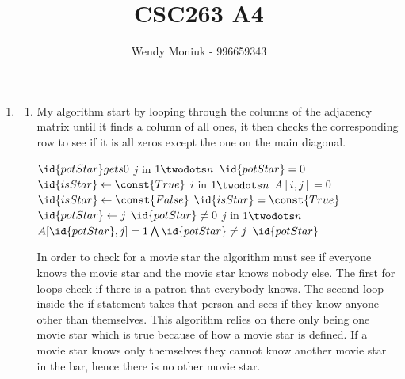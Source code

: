 \documentclass[10pt,a4paper]{article}
\author{Wendy Moniuk - 996659343}
\title{CSC263 A4}
\begin{document}
\begin{enumerate}
\item
\begin{enumerate}
\item
My algorithm start by looping through the columns of the adjacency matrix until it finds a column of all ones, it then checks the corresponding row to see if it is all zeros except the one on the main diagonal.
\begin{codebox}
\li $\id{potStar} gets 0$
\li \For $j$ in $1\twodots n$
\li 	\Do
\li 	\If $\id{potStar} = 0$
\li		$\id{isStar} \gets \const{True}$
\li 	\For $i$ in $1\twodots n$
\li 	\Do
\li 		\If $A[i,j] = 0$
\li \Then
\li 	$\id{isStar} \gets \const{False}$
		\End
		\End
\li 	\If $\id{isStar} = \const{True}$ 
\li \Then
\li 	$\id{potStar} \gets j$
	\End
	\End
\li \If $\id{potStar} \neq 0$
\li \Then
\li \For $j$ in $1\twodots n$
\li \Do
\li 	\If $A[\id{potStar}, j] = 1 \bigwedge \id{potStar} \neq j$
\li 	\Then 
\li 		\Return 0	
		\End
\End
\End
\li \Return $\id{potStar}$

\end{codebox}

In order to check for a movie star the algorithm must see if everyone knows the movie star and the movie star knows nobody else. The first for loops check if there is a patron that everybody knows. The second loop inside the if statement takes that person and sees if they know anyone other than themselves. This algorithm relies on there only being one movie star which is true because of how a movie star is defined. If a movie star knows only themselves they cannot know another movie star in the bar, hence there is no other movie star.


\end{enumerate}
\end{enumerate}
\end{document}
